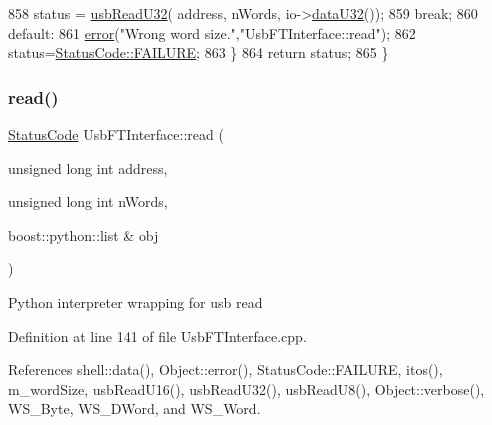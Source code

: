 \begin{DoxyCode}
858     status = \hyperlink{classUsbFTInterface_a7eadb8a94323fada4c72ed1c992792cc}{usbReadU32}( address, nWords, io->\hyperlink{classIOdata_ab0e3cd09f46c1c3712f797116f6da074}{dataU32}());
859     \textcolor{keywordflow}{break};
860   \textcolor{keywordflow}{default}:
861     \hyperlink{classObject_a204a95f57818c0f811933917a30eff45}{error}(\textcolor{stringliteral}{"Wrong word size."},\textcolor{stringliteral}{"UsbFTInterface::read"});
862     status=\hyperlink{classStatusCode_a6f565cbeadc76d14c72f047e5e85eb4ba3da73d4c469762eb9d3c960368252b26}{StatusCode::FAILURE};
863   \}
864   \textcolor{keywordflow}{return} status;
865 \}
\end{DoxyCode}
\mbox{\label{classUsbFTInterface_a682e63cb6168be314aa3cc6e6a10ec59}} 
\subsubsection{\texorpdfstring{read()}{read()}\hspace{0.1cm}{\footnotesize\ttfamily [2/2]}}
{\footnotesize\ttfamily \hyperlink{classStatusCode}{Status\+Code} Usb\+F\+T\+Interface\+::read (\begin{DoxyParamCaption}\item[{unsigned long int}]{address,  }\item[{unsigned long int}]{n\+Words,  }\item[{boost\+::python\+::list \&}]{obj }\end{DoxyParamCaption})}

Python interpreter wrapping for usb read 

Definition at line 141 of file Usb\+F\+T\+Interface.\+cpp.



References shell\+::data(), Object\+::error(), Status\+Code\+::\+F\+A\+I\+L\+U\+RE, itos(), m\+\_\+word\+Size, usb\+Read\+U16(), usb\+Read\+U32(), usb\+Read\+U8(), Object\+::verbose(), W\+S\+\_\+\+Byte, W\+S\+\_\+\+D\+Word, and W\+S\+\_\+\+Word.


